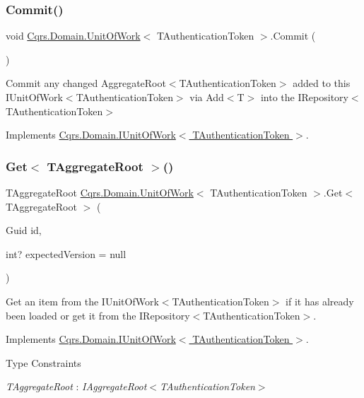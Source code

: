 \subsubsection{\texorpdfstring{Commit()}{Commit()}}
{\footnotesize\ttfamily void \hyperlink{classCqrs_1_1Domain_1_1UnitOfWork}{Cqrs.\+Domain.\+Unit\+Of\+Work}$<$ T\+Authentication\+Token $>$.Commit (\begin{DoxyParamCaption}{ }\end{DoxyParamCaption})}



Commit any changed Aggregate\+Root$<$\+T\+Authentication\+Token$>$ added to this I\+Unit\+Of\+Work$<$\+T\+Authentication\+Token$>$ via Add$<$\+T$>$ into the I\+Repository$<$\+T\+Authentication\+Token$>$ 



Implements \hyperlink{interfaceCqrs_1_1Domain_1_1IUnitOfWork_ade600c9bf9e8380c24eaf1e7e0df6e01}{Cqrs.\+Domain.\+I\+Unit\+Of\+Work$<$ T\+Authentication\+Token $>$}.

\mbox{\label{classCqrs_1_1Domain_1_1UnitOfWork_a1e953136c916aee711068813078aed05}} 
\subsubsection{\texorpdfstring{Get$<$ T\+Aggregate\+Root $>$()}{Get< TAggregateRoot >()}}
{\footnotesize\ttfamily T\+Aggregate\+Root \hyperlink{classCqrs_1_1Domain_1_1UnitOfWork}{Cqrs.\+Domain.\+Unit\+Of\+Work}$<$ T\+Authentication\+Token $>$.Get$<$ T\+Aggregate\+Root $>$ (\begin{DoxyParamCaption}\item[{Guid}]{id,  }\item[{int?}]{expected\+Version = {\ttfamily null} }\end{DoxyParamCaption})}



Get an item from the I\+Unit\+Of\+Work$<$\+T\+Authentication\+Token$>$ if it has already been loaded or get it from the I\+Repository$<$\+T\+Authentication\+Token$>$. 



Implements \hyperlink{interfaceCqrs_1_1Domain_1_1IUnitOfWork_aad3e9f94cbe6941163feb9fe00ddbe06}{Cqrs.\+Domain.\+I\+Unit\+Of\+Work$<$ T\+Authentication\+Token $>$}.

\begin{Desc}
\item[Type Constraints]\begin{description}
\item[{\em T\+Aggregate\+Root} : {\em I\+Aggregate\+Root$<$T\+Authentication\+Token$>$}]\end{description}
\end{Desc}
